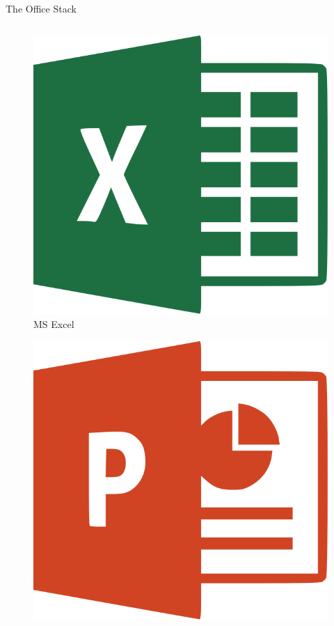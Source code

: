 \documentclass[10pt]{beamer}
\begin{document}
\begin{frame}{The Office Stack}
\begin{columns}[T]
\begin{column}{0.33\textwidth}
\begin{figure}
                    \centering
                    \includegraphics[height=0.1\paperheight]{images/excel}
                    \caption{MS Excel}
                \end{figure}
                \begin{figure}
                    \centering
                    \includegraphics[height=0.1\paperheight]{images/powerpoint}

\end{figure}
\end{column}
\end{columns}
\end{frame}
\end{document}
